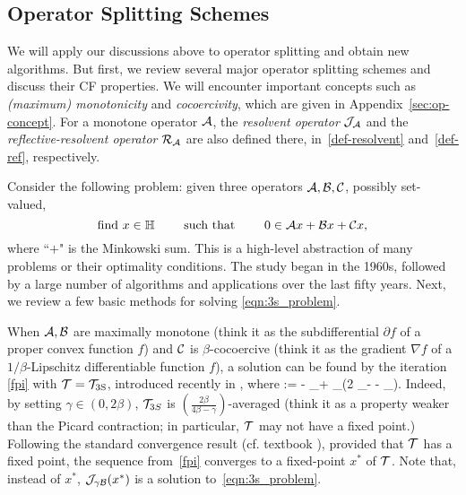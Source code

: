 \subsection{Operator Splitting Schemes}\label{sec:splitting}
We will apply our discussions above to operator splitting and  obtain new algorithms. But first, we review several major operator splitting schemes and discuss their CF properties. We will encounter important concepts such as \emph{(maximum) monotonicity} and \emph{cocoercivity}, which are given in Appendix~\ref{sec:op-concept}. For a monotone  operator ${\mathcal{A}}$, the \emph{resolvent operator} ${\mathcal{J}}_{{\mathcal{A}}}$ and the \emph{reflective-resolvent operator}  ${\mathcal{R}}_{{\mathcal{A}}}$ are also defined there, in~\eqref{def-resolvent} and~\eqref{def-ref}, respectively.   %

Consider the following problem: given three operators ${\mathcal{A}},{\mathcal{B}},{\mathcal{C}}$, possibly set-valued,  \begin{equation}\label{eqn:3s_problem}
\text{find } x \in \HH \qquad \text{ such that }  \qquad 0 \in \cA x + \cB x +\cC x,
\end{equation}
where ``$+$" is the Minkowski sum.
This is a high-level abstraction of many problems or their optimality conditions. The study began in the 1960s, followed by a large number of algorithms and applications over the last fifty years. Next, we review a few basic methods for solving \eqref{eqn:3s_problem}.

When ${\mathcal{A}}, {\mathcal{B}}$ are maximally monotone (think it as the subdifferential $\partial f$ of a proper convex function $f$) and ${\mathcal{C}}$ is $\beta$-cocoercive (think it as the gradient $\nabla f$ of a $1/\beta$-Lipschitz differentiable function $f$),  a solution can be found by the iteration \eqref{fpi} with ${\mathcal{T}}={{\mathcal{T}}_{\mathrm{3S}}}$, introduced recently in \cite{davis2015three}, where  
\beq\label{3s}
\TS := \cI- \cJ_{\gamma \cB}+ \cJ_{\gamma \cA}\circ(2 \cJ_{\gamma \cB}- \cI - \gamma \cC\circ \cJ_{\gamma \cB}).
\eeq {}Indeed, by setting  $\gamma\in(0,2\beta)$, ${\mathcal{T}}_{3S}$ is $(\frac{2\beta}{4\beta-\gamma})$-averaged (think it as a property weaker than the Picard contraction; in particular,  ${\mathcal{T}}$ may not have a fixed point.) Following the standard convergence result (cf. textbook \cite{bauschke2011convex}), provided that ${\mathcal{T}}$ has a  fixed point, the sequence from~\eqref{fpi} converges to a fixed-point $x^*$ of ${\mathcal{T}}$. Note that, instead of $x^*$, ${\mathcal{J}}_{\gamma{\mathcal{B}}}(x^*)$ is a solution to~\eqref{eqn:3s_problem}.  

